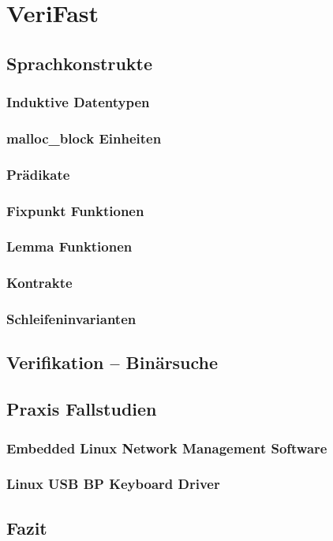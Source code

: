\section{VeriFast}

\subsection{Sprachkonstrukte}

\subsubsection{Induktive Datentypen}

\subsubsection{malloc\_block Einheiten}

\subsubsection{Prädikate}

\subsubsection{Fixpunkt Funktionen}

\subsubsection{Lemma Funktionen}

\subsubsection{Kontrakte}

\subsubsection{Schleifeninvarianten}

\subsection{Verifikation -- Binärsuche}

\subsection{Praxis Fallstudien}

\subsubsection{Embedded Linux Network Management Software}

\subsubsection{Linux USB BP Keyboard Driver}

\subsection{Fazit}